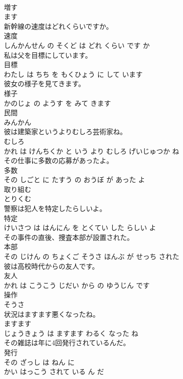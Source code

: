 \documentclass[8pt]{extreport}
\begin{document}
\begin{CJK}{UTF8}{min}
\\	増す	
\\	ます		
\\	新幹線の速度はどれくらいですか。	
\\	速度 
\\	しんかんせん の そくど は どれ くらい です か			
\\	私は父を目標にしています。	
\\	目標 
\\	わたし は ちち を もくひょう に して います			
\\	彼女の様子を見てきます。	
\\	様子 
\\	かのじょ の ようす を みて きます			
\\	民間	
\\	みんかん		
\\	彼は建築家というよりむしろ芸術家ね。	
\\	むしろ 
\\	かれ は けんちくか と いう より むしろ げいじゅつか ね			
\\	その仕事に多数の応募があったよ。	
\\	多数 
\\	その しごと に たすう の おうぼ が あった よ			
\\	取り組む	
\\	とりくむ		
\\	警察は犯人を特定したらしいよ。	
\\	特定 
\\	けいさつ は はんにん を とくてい した らしい よ			
\\	その事件の直後、捜査本部が設置された。	
\\	本部 
\\	その じけん の ちょくご そうさ ほんぶ が せっち された			
\\	彼は高校時代からの友人です。	
\\	友人 
\\	かれ は こうこう じだい から の ゆうじん です			
\\	操作	
\\	そうさ		
\\	状況はますます悪くなったね。	
\\	ますます 
\\	じょうきょう は ますます わるく なった ね			
\\	その雑誌は年に4回発行されているんだ。	
\\	発行 
\\	その ざっし は ねん に 
\\	かい はっこう されて いる ん だ			

\end{CJK}
\end{document}
